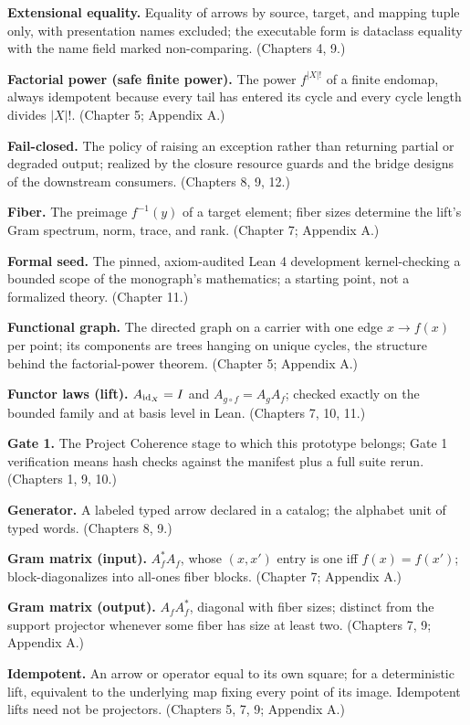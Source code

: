 \textbf{Extensional equality.} Equality of arrows by source, target,
and mapping tuple only, with presentation names excluded; the
executable form is dataclass equality with the name field marked
non-comparing. (Chapters 4, 9.)

\textbf{Factorial power (safe finite power).} The power $f^{|X|!}$ of
a finite endomap, always idempotent because every tail has entered its
cycle and every cycle length divides $|X|!$. (Chapter 5; Appendix A.)

\textbf{Fail-closed.} The policy of raising an exception rather than
returning partial or degraded output; realized by the closure resource
guards and the bridge designs of the downstream consumers.
(Chapters 8, 9, 12.)

\textbf{Fiber.} The preimage $f^{-1}(y)$ of a target element; fiber
sizes determine the lift's Gram spectrum, norm, trace, and rank.
(Chapter 7; Appendix A.)

\textbf{Formal seed.} The pinned, axiom-audited Lean 4 development
kernel-checking a bounded scope of the monograph's mathematics; a
starting point, not a formalized theory. (Chapter 11.)

\textbf{Functional graph.} The directed graph on a carrier with one
edge $x \to f(x)$ per point; its components are trees hanging on
unique cycles, the structure behind the factorial-power theorem.
(Chapter 5; Appendix A.)

\textbf{Functor laws (lift).} $A_{\mathrm{id}_X} = I$ and
$A_{g \circ f} = A_g A_f$; checked exactly on the bounded family and
at basis level in Lean. (Chapters 7, 10, 11.)

\textbf{Gate 1.} The Project Coherence stage to which this prototype
belongs; Gate 1 verification means hash checks against the manifest
plus a full suite rerun. (Chapters 1, 9, 10.)

\textbf{Generator.} A labeled typed arrow declared in a catalog; the
alphabet unit of typed words. (Chapters 8, 9.)

\textbf{Gram matrix (input).} $A_f^{*} A_f$, whose $(x, x')$ entry is
one iff $f(x) = f(x')$; block-diagonalizes into all-ones fiber blocks.
(Chapter 7; Appendix A.)

\textbf{Gram matrix (output).} $A_f A_f^{*}$, diagonal with fiber
sizes; distinct from the support projector whenever some fiber has
size at least two. (Chapters 7, 9; Appendix A.)

\textbf{Idempotent.} An arrow or operator equal to its own square;
for a deterministic lift, equivalent to the underlying map fixing
every point of its image. Idempotent lifts need not be projectors.
(Chapters 5, 7, 9; Appendix A.)

